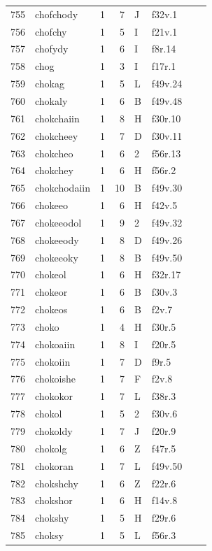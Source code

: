 \documentclass[11pt,a4paper]{article}
\begin{document}
\begin{landscape}
\begin{longtable}{@{}r>{\ttfamily}lrrl>{\ttfamily}l>{\raggedright\arraybackslash}p{80mm}>{\raggedright\arraybackslash}p{36mm}@{}}
755 & chofchody & 1 & 7 & J & f32v.1 &  & \\
756 & chofchy & 1 & 5 & I & f21v.1 &  & \\
757 & chofydy & 1 & 6 & I & f8r.14 &  & \\
758 & chog & 1 & 3 & I & f17r.1 &  & \\
759 & chokag & 1 & 5 & L & f49v.24 &  & \\
760 & chokaly & 1 & 6 & B & f49v.48 &  & \\
761 & chokchaiin & 1 & 8 & H & f30r.10 &  & \\
762 & chokcheey & 1 & 7 & D & f30v.11 &  & \\
763 & chokcheo & 1 & 6 & 2 & f56r.13 &  & \\
764 & chokchey & 1 & 6 & H & f56r.2 &  & \\
765 & chokchodaiin & 1 & 10 & B & f49v.30 &  & \\
766 & chokeeo & 1 & 6 & H & f42v.5 &  & \\
767 & chokeeodol & 1 & 9 & 2 & f49v.32 &  & \\
768 & chokeeody & 1 & 8 & D & f49v.26 &  & \\
769 & chokeeoky & 1 & 8 & B & f49v.50 &  & \\
770 & chokeol & 1 & 6 & H & f32r.17 &  & \\
771 & chokeor & 1 & 6 & B & f30v.3 &  & \\
772 & chokeos & 1 & 6 & B & f2v.7 &  & \\
773 & choko & 1 & 4 & H & f30r.5 &  & \\
774 & chokoaiin & 1 & 8 & I & f20r.5 &  & \\
775 & chokoiin & 1 & 7 & D & f9r.5 &  & \\
776 & chokoishe & 1 & 7 & F & f2v.8 &  & \\
777 & chokokor & 1 & 7 & L & f38r.3 &  & \\
778 & chokol & 1 & 5 & 2 & f30v.6 &  & \\
779 & chokoldy & 1 & 7 & J & f20r.9 &  & \\
780 & chokolg & 1 & 6 & Z & f47r.5 &  & \\
781 & chokoran & 1 & 7 & L & f49v.50 &  & \\
782 & chokshchy & 1 & 6 & Z & f22r.6 &  & \\
783 & chokshor & 1 & 6 & H & f14v.8 &  & \\
784 & chokshy & 1 & 5 & H & f29r.6 &  & \\
785 & choksy & 1 & 5 & L & f56r.3 &  & \\

\end{longtable}
\end{landscape}
\end{document}
